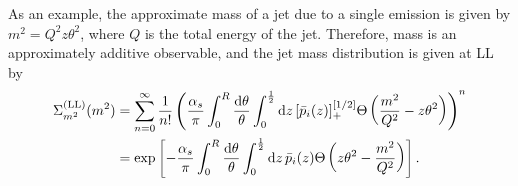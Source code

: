 \begin{example}
As an example, the approximate mass of a jet due to a single emission is given by \(m^2 = Q^2 z\theta^2\), where \(Q\) is the total energy of the jet.
%
Therefore, mass is an approximately additive observable, and the jet mass distribution is given at LL by
%
\begin{equation}
\label{eq:LL_mass}
\begin{aligned}
    \Sigma^{\rm(LL)}_{m^2}(m^2)
    &=
    \sum_{n = 0}^{\infty}\frac{1}{n!}
    \left(
    \frac{\alpha_s}{\pi}
    \int_0^R \frac{\dd\theta}{\theta}
    \int_0^{\frac{1}{2}} \dd z\,[\bar{p}_i(z)]_+^{[1/2]}
    \Theta\left(
    \frac{m^2}{Q^2} - z\theta^2
    \right)
    \right)^n
    \\
    &=
    \exp\left[
    -\frac{\alpha_s}{\pi}
    \int_0^R \frac{\dd\theta}{\theta}
    \int_0^{\frac{1}{2}} \dd z\,\bar{p}_i(z)
    \Theta\left(
    z \theta^2 - \frac{m^2}{Q^2}
    \right)
    \right]
    .
\end{aligned}
\end{equation}




\end{example}
